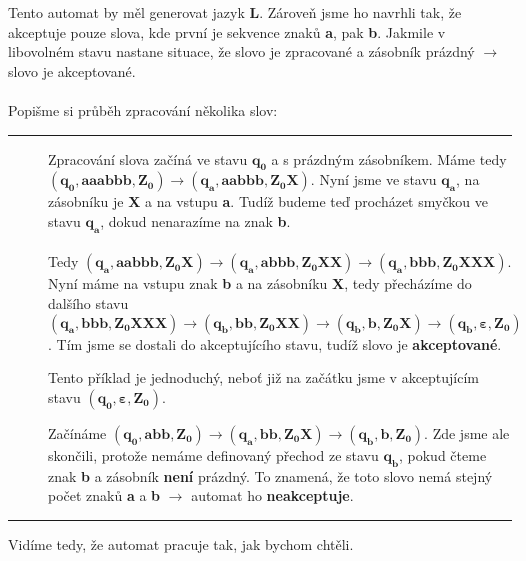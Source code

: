 \documentclass{report}
\begin{document}
Tento automat by měl generovat jazyk \textbf{L}. Zároveň jsme ho navrhli tak, že akceptuje pouze slova, kde první je sekvence znaků \textbf{a}, pak \textbf{b}. Jakmile v libovolném stavu nastane situace, že slovo je zpracované a zásobník prázdný $\rightarrow$ slovo je akceptované.
\pagebreak
\\ \\
Popišme si průběh zpracování několika slov:
\vspace{0.4cm}    
\hrule
\vspace{0.1cm}
\begin{description}
    \item[] Zpracování slova začíná ve stavu $\mathbf{q_0}$ a s prázdným zásobníkem. Máme tedy $\mathbf{(q_0,aaabbb,Z_0)\rightarrow (q_a,aabbb,Z_0X)}$. Nyní jsme ve stavu $\mathbf{q_a}$, na zásobníku je \textbf{X} a na vstupu \textbf{a}. Tudíž budeme teď procházet smyčkou ve stavu $\mathbf{q_a}$, dokud nenarazíme na znak \textbf{b}.\\ \\Tedy $\mathbf{(q_a,aabbb,Z_0X)\rightarrow(q_a,abbb,Z_0XX)\rightarrow(q_a,bbb,Z_0XXX)}$. \\ Nyní máme na vstupu znak \textbf{b} a na zásobníku \textbf{X}, tedy přecházíme do dalšího stavu \\ 
    $\mathbf{(q_a,bbb,Z_0XXX) \rightarrow (q_b,bb,Z_0XX)\rightarrow(q_b,b,Z_0X)\rightarrow(q_b,\varepsilon,Z_0)}$. Tím jsme se dostali do akceptujícího stavu, tudíž slovo je \textbf{akceptované}.
    
    \item[] Tento příklad je jednoduchý, neboť již na začátku jsme v akceptujícím stavu $\mathbf{(q_0,\varepsilon,Z_0)}$.
    
    \item[] Začínáme $\mathbf{(q_0,abb,Z_0)\rightarrow(q_a,bb,Z_0X)\rightarrow(q_b,b,Z_0)}$. Zde jsme ale skončili, protože nemáme definovaný přechod ze stavu $\mathbf{q_b}$, pokud čteme znak \textbf{b} a zásobník \textbf{není} prázdný. To znamená, že toto slovo nemá stejný počet znaků \textbf{a} a \textbf{b} $\rightarrow$ automat ho \textbf{neakceptuje}.
\end{description}
\vspace{0.1cm}    
\hrule
\vspace{0.4cm}
Vidíme tedy, že automat pracuje tak, jak bychom chtěli.
\pagebreak
\\ \\
\end{document}
